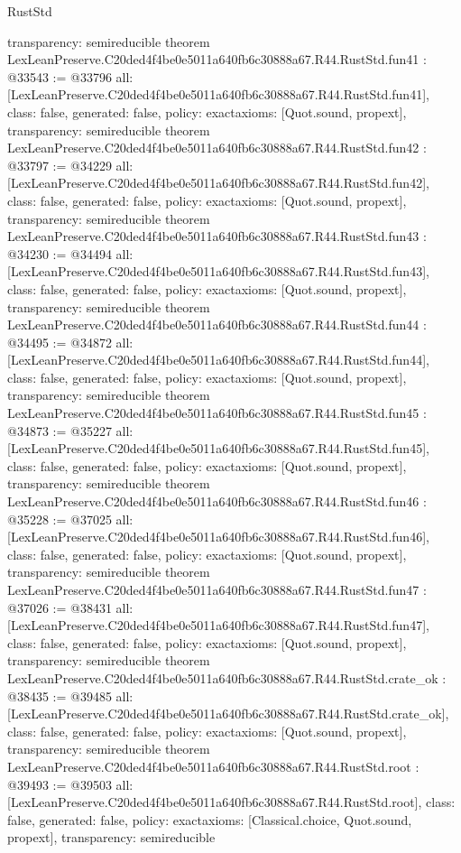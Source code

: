 \begin{lexlean}{RustStd}
\begin{coremodule}
{  transparency: semireducible
}
theorem LexLeanPreserve.C20ded4f4be0e5011a640fb6c30888a67.R44.RustStd.fun41 : @33543 := @33796 {
  all: [LexLeanPreserve.C20ded4f4be0e5011a640fb6c30888a67.R44.RustStd.fun41],
  class: false,
  generated: false,
  policy: exact{axioms: [Quot.sound, propext]},
  transparency: semireducible
}
theorem LexLeanPreserve.C20ded4f4be0e5011a640fb6c30888a67.R44.RustStd.fun42 : @33797 := @34229 {
  all: [LexLeanPreserve.C20ded4f4be0e5011a640fb6c30888a67.R44.RustStd.fun42],
  class: false,
  generated: false,
  policy: exact{axioms: [Quot.sound, propext]},
  transparency: semireducible
}
theorem LexLeanPreserve.C20ded4f4be0e5011a640fb6c30888a67.R44.RustStd.fun43 : @34230 := @34494 {
  all: [LexLeanPreserve.C20ded4f4be0e5011a640fb6c30888a67.R44.RustStd.fun43],
  class: false,
  generated: false,
  policy: exact{axioms: [Quot.sound, propext]},
  transparency: semireducible
}
theorem LexLeanPreserve.C20ded4f4be0e5011a640fb6c30888a67.R44.RustStd.fun44 : @34495 := @34872 {
  all: [LexLeanPreserve.C20ded4f4be0e5011a640fb6c30888a67.R44.RustStd.fun44],
  class: false,
  generated: false,
  policy: exact{axioms: [Quot.sound, propext]},
  transparency: semireducible
}
theorem LexLeanPreserve.C20ded4f4be0e5011a640fb6c30888a67.R44.RustStd.fun45 : @34873 := @35227 {
  all: [LexLeanPreserve.C20ded4f4be0e5011a640fb6c30888a67.R44.RustStd.fun45],
  class: false,
  generated: false,
  policy: exact{axioms: [Quot.sound, propext]},
  transparency: semireducible
}
theorem LexLeanPreserve.C20ded4f4be0e5011a640fb6c30888a67.R44.RustStd.fun46 : @35228 := @37025 {
  all: [LexLeanPreserve.C20ded4f4be0e5011a640fb6c30888a67.R44.RustStd.fun46],
  class: false,
  generated: false,
  policy: exact{axioms: [Quot.sound, propext]},
  transparency: semireducible
}
theorem LexLeanPreserve.C20ded4f4be0e5011a640fb6c30888a67.R44.RustStd.fun47 : @37026 := @38431 {
  all: [LexLeanPreserve.C20ded4f4be0e5011a640fb6c30888a67.R44.RustStd.fun47],
  class: false,
  generated: false,
  policy: exact{axioms: [Quot.sound, propext]},
  transparency: semireducible
}
theorem LexLeanPreserve.C20ded4f4be0e5011a640fb6c30888a67.R44.RustStd.crate_ok : @38435 := @39485 {
  all: [LexLeanPreserve.C20ded4f4be0e5011a640fb6c30888a67.R44.RustStd.crate_ok],
  class: false,
  generated: false,
  policy: exact{axioms: [Quot.sound, propext]},
  transparency: semireducible
}
theorem LexLeanPreserve.C20ded4f4be0e5011a640fb6c30888a67.R44.RustStd.root : @39493 := @39503 {
  all: [LexLeanPreserve.C20ded4f4be0e5011a640fb6c30888a67.R44.RustStd.root],
  class: false,
  generated: false,
  policy: exact{axioms: [Classical.choice, Quot.sound, propext]},
  transparency: semireducible
}


\end{coremodule}
\end{lexlean}
